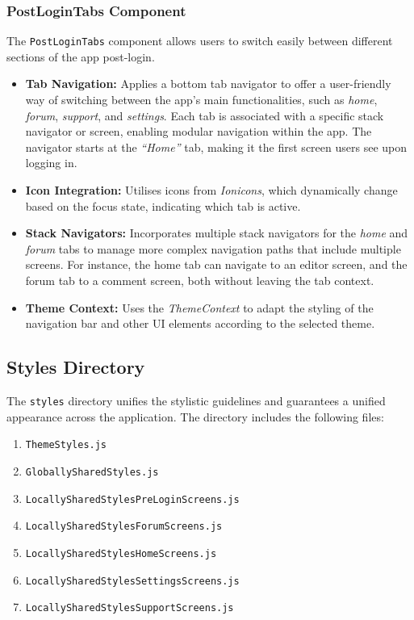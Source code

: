\subsubsection{PostLoginTabs Component}

The \texttt{PostLoginTabs} component allows users to switch easily between different sections of the app post-login. 

\begin{itemize}
    \item \textbf{Tab Navigation:} Applies a bottom tab navigator to offer a user-friendly way of switching between the app's main functionalities, such as \textit{home}, \textit{forum}, \textit{support}, and \textit{settings}. Each tab is associated with a specific stack navigator or screen, enabling modular navigation within the app. The navigator starts at the \textit{``Home''} tab, making it the first screen users see upon logging in. 
    \item \textbf{Icon Integration:} Utilises icons from \textit{Ionicons}, which dynamically change based on the focus state, indicating which tab is active.
    \item \textbf{Stack Navigators:} Incorporates multiple stack navigators for the \textit{home} and \textit{forum} tabs to manage more complex navigation paths that include multiple screens. For instance, the home tab can navigate to an editor screen, and the forum tab to a comment screen, both without leaving the tab context.
    \item \textbf{Theme Context:} Uses the \textit{ThemeContext} to adapt the styling of the navigation bar and other UI elements according to the selected theme. 
\end{itemize}

\subsection{Styles Directory}

The \texttt{styles} directory unifies the stylistic guidelines and guarantees a unified appearance across the application. The directory includes the following files:

\begin{enumerate}
    \item \texttt{ThemeStyles.js}
    \item \texttt{GloballySharedStyles.js}
    \item \texttt{LocallySharedStylesPreLoginScreens.js}
    \item \texttt{LocallySharedStylesForumScreens.js}
    \item \texttt{LocallySharedStylesHomeScreens.js}
    \item \texttt{LocallySharedStylesSettingsScreens.js}
    \item \texttt{LocallySharedStylesSupportScreens.js}
\end{enumerate}

